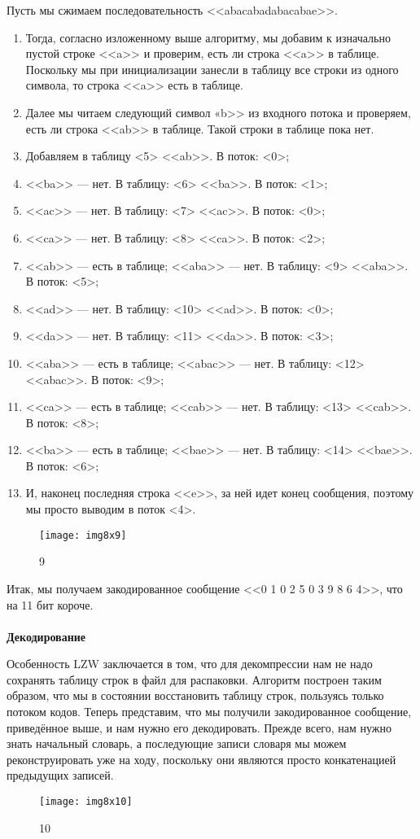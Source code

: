 Пусть мы сжимаем последовательность <<abacabadabacabae>>.
\begin{enumerate}
\item Тогда, согласно изложенному выше алгоритму, мы добавим к изначально
    пустой строке <<a>> и проверим, есть ли строка <<a>> в таблице. Поскольку мы
    при инициализации занесли в таблицу все строки из одного символа, то
    строка <<a>> есть в таблице.
\item Далее мы читаем следующий символ «b>> из входного потока и проверяем,
    есть ли строка <<ab>> в таблице. Такой строки в таблице пока нет.
\item Добавляем в таблицу <5> <<ab>>. В поток: <0>;
\item <<ba>> — нет. В таблицу: <6> <<ba>>. В поток: <1>;
\item <<ac>> — нет. В таблицу: <7> <<ac>>. В поток: <0>;
\item <<ca>> — нет. В таблицу: <8> <<ca>>. В поток: <2>;
\item <<ab>> — есть в таблице; <<aba>> — нет. В таблицу: <9> <<aba>>. В
    поток: <5>;
\item <<ad>> — нет. В таблицу: <10> <<ad>>. В поток: <0>;
\item <<da>> — нет. В таблицу: <11> <<da>>. В поток: <3>;
\item <<aba>> — есть в таблице; <<abac>> — нет. В таблицу: <12> <<abac>>. В
    поток: <9>;
\item <<ca>> — есть в таблице; <<cab>> — нет. В таблицу: <13> <<cab>>. В
    поток: <8>;
\item <<ba>> — есть в таблице; <<bae>> — нет. В таблицу: <14> <<bae>>. В
    поток: <6>;
\item И, наконец последняя строка <<e>>, за ней идет конец сообщения,
    поэтому мы просто выводим в поток <4>.
\end{enumerate}
\begin{figure}[h]
  \centering
  \texttt{[image: img8x9]}
  \caption{9}\label{img:8x9}
\end{figure}
Итак, мы получаем закодированное сообщение <<0 1 0 2 5 0 3 9 8 6 4>>, что на
11 бит короче.
\\
\\
\noindent\textbf{Декодирование}

Особенность LZW заключается в том, что для декомпрессии нам не надо сохранять
таблицу строк в файл для распаковки. Алгоритм построен таким образом, что мы
в состоянии восстановить таблицу строк, пользуясь только потоком кодов.
Теперь представим, что мы получили закодированное сообщение, приведённое
выше, и нам нужно его декодировать. Прежде всего, нам нужно знать начальный
словарь, а последующие записи словаря мы можем реконструировать уже на ходу,
поскольку они являются просто конкатенацией предыдущих записей.
\begin{figure}[h]
  \centering
  \texttt{[image: img8x10]}
  \caption{10}\label{img:8x10}
\end{figure}

